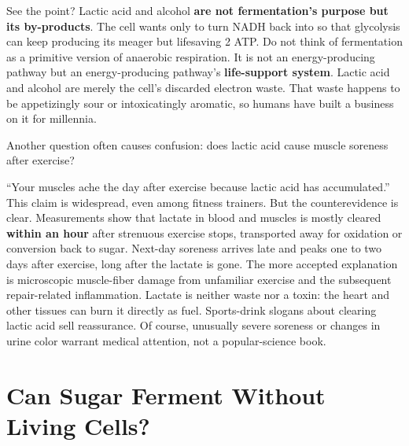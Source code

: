 See the point? Lactic acid and alcohol \textbf{are not fermentation's purpose but its by-products}. The cell wants only to turn NADH back into  so that glycolysis can keep producing its meager but lifesaving 2 ATP. Do not think of fermentation as a primitive version of anaerobic respiration. It is not an energy-producing pathway but an energy-producing pathway's \textbf{life-support system}. Lactic acid and alcohol are merely the cell's discarded electron waste. That waste happens to be appetizingly sour or intoxicatingly aromatic, so humans have built a business on it for millennia.

Another question often causes confusion: does lactic acid cause muscle soreness after exercise?

\begin{wuqu}
``Your muscles ache the day after exercise because lactic acid has accumulated.'' This claim is widespread, even among fitness trainers. But the counterevidence is clear. Measurements show that lactate in blood and muscles is mostly cleared \textbf{within an hour} after strenuous exercise stops, transported away for oxidation or conversion back to sugar. Next-day soreness arrives late and peaks one to two days after exercise, long after the lactate is gone. The more accepted explanation is microscopic muscle-fiber damage from unfamiliar exercise and the subsequent repair-related inflammation. Lactate is neither waste nor a toxin: the heart and other tissues can burn it directly as fuel. Sports-drink slogans about clearing lactic acid sell reassurance. Of course, unusually severe soreness or changes in urine color warrant medical attention, not a popular-science book.
\end{wuqu}

\section{Can Sugar Ferment Without Living Cells?}

